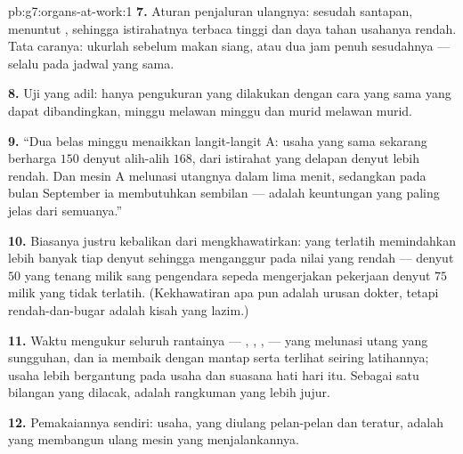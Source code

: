 \begin{solution}{pb:g7:organs-at-work:1}
\textbf{7.} Aturan penjaluran ulangnya: sesudah santapan,  menuntut , sehingga  istirahatnya
terbaca tinggi dan daya tahan usahanya rendah. Tata caranya: ukurlah
sebelum makan siang, atau dua jam penuh sesudahnya --- selalu pada
jadwal yang sama.

\textbf{8.} Uji yang adil: hanya pengukuran yang dilakukan dengan cara
yang sama yang dapat dibandingkan, minggu melawan minggu dan murid
melawan murid.

\textbf{9.} ``Dua belas minggu menaikkan langit-langit A: usaha yang
sama sekarang berharga $150$ denyut alih-alih $168$, dari 
istirahat yang delapan denyut lebih rendah. Dan mesin A melunasi
utangnya dalam lima menit, sedangkan pada bulan September ia
membutuhkan sembilan ---  adalah keuntungan yang paling
jelas dari semuanya.''

\textbf{10.} Biasanya justru kebalikan dari mengkhawatirkan: 
yang terlatih memindahkan lebih banyak  tiap denyut sehingga
menganggur pada nilai yang rendah --- denyut $50$ yang tenang milik
sang pengendara sepeda mengerjakan pekerjaan denyut $75$ milik yang
tidak terlatih. (Kekhawatiran apa pun adalah urusan dokter, tetapi
rendah-dan-bugar adalah kisah yang lazim.)

\textbf{11.} Waktu  mengukur seluruh rantainya --- ,
, ,  --- yang melunasi utang yang sungguhan, dan
ia membaik dengan mantap serta terlihat seiring latihannya;  usaha lebih bergantung pada usaha dan suasana hati hari itu.
Sebagai satu bilangan yang dilacak,  adalah rangkuman yang
lebih jujur.

\textbf{12.} Pemakaiannya sendiri: usaha, yang diulang pelan-pelan dan
teratur, adalah yang membangun ulang mesin yang menjalankannya.
\end{solution}
